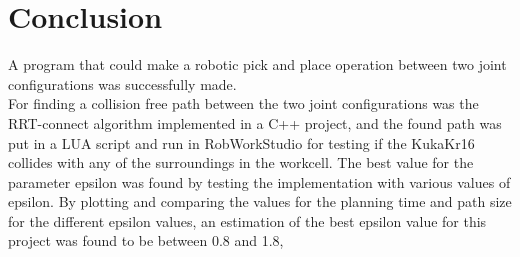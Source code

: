 \documentclass[11pt]{article}
\begin{document}
\newpage
\section{Conclusion}
A program that could make a robotic pick and place operation between two joint configurations was successfully made.\\[0.2cm]


\noindent For finding a collision free path between the two joint configurations was the RRT-connect algorithm implemented in a C++ project, and the found path was put in a LUA script and run in RobWorkStudio for testing if the KukaKr16 collides with any of the surroundings in the workcell. The best value for the parameter epsilon was found by testing the implementation with various values of epsilon. By plotting and comparing the values for the planning time and path size for the different epsilon values, an estimation of the best epsilon value for this project was found to be between 0.8 and 1.8,
\end{document}
